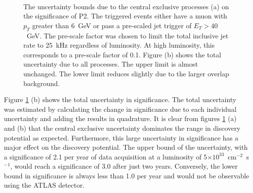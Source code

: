 \begin{figure}[t]
\centering
\mbox{
	\quad
	}
\caption[The uncertainty bounds on the significance of MSSM benchmark point 2]{The uncertainty bounds due to the central exclusive processes (a) on the significance of P2. The triggered events either have a muon with $p_T$ greater than 6~GeV or pass a pre-scaled jet trigger of $E_T>40$~GeV. The pre-scale factor was chosen to limit the total inclusive jet rate to 25~kHz regardless of luminosity. At high luminosity, this corresponds to a pre-scale factor of 0.1. Figure (b) shows the total uncertainty due to all processes. The upper limit is almost unchanged. The lower limit reduces slightly due to the larger overlap background.\label{uncertaintybounds}}
\end{figure}

Figure \ref{uncertaintybounds} (b) shows the total uncertainty in significance. The total uncertainty was estimated by calculating the change in significance due to each individual uncertainty and adding the results in quadrature. It is clear from figures \ref{uncertaintybounds} (a) and (b)  that the central exclusive  uncertainty dominates the range in discovery potential as expected. Furthermore, this large uncertainty in significance has a major effect on the discovery potential. The upper bound of the uncertainty, with a significance of 2.1 per year of data acquisition at a luminosity of 5$\times10^{33}$~cm$^{-2}$~s$^{-1}$, would reach a significance of 3.0 after just two years. Conversely, the lower bound in significance is always less than 1.0 per year and would not be observable using the ATLAS detector.


 
 
